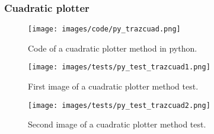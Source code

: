 \documentclass{article}
\begin{document}
\subsubsection{Cuadratic plotter}
\begin{figure}[ht]
\centering
\texttt{[image: images/code/py\_trazcuad.png]}
\caption{\label{fig:py_gausspar}Code of a cuadratic plotter method in python.}
\end{figure}
\FloatBarrier
\begin{figure}[ht]
\centering
\texttt{[image: images/tests/py\_test\_trazcuad1.png]}
\caption{\label{fig:py_gausspar}First image of a cuadratic plotter method test.}
\end{figure}
\FloatBarrier
\FloatBarrier
\begin{figure}[ht]
\centering
\texttt{[image: images/tests/py\_test\_trazcuad2.png]}
\caption{\label{fig:py_gausspar}Second image of a cuadratic plotter method test.}
\end{figure}
\FloatBarrier
\end{document}
